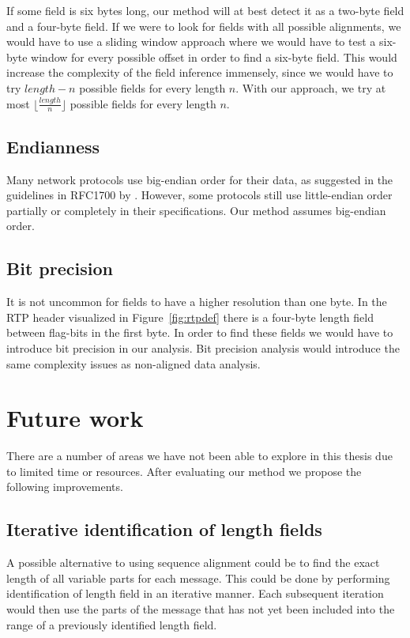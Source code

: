 \documentclass[a4paper]{report}
\begin{document}
If some field is six bytes long, our method will at best detect it as a
two-byte field and a four-byte field. If we were to look for fields with
all possible alignments, we would have to use a sliding window approach where
we would have to test a six-byte window for every possible offset in order
to find a six-byte field. This would increase the complexity of the field
inference immensely, since we would have to try $length - n$ possible fields
for every length $n$. With our approach, we try at most
$\lfloor \frac{length}{n} \rfloor$ possible fields for every length $n$.

\subsection{Endianness}
Many network protocols use big-endian order for their data, as suggested
in the guidelines in RFC1700 by \citet{reynolds94}. However, some protocols
still use little-endian order partially or completely in their specifications.
Our method assumes big-endian order.

\subsection{Bit precision}
It is not uncommon for fields to have a higher resolution than one byte. In
the RTP header visualized in Figure~\ref{fig:rtpdef} there is a four-byte
length field between flag-bits in the first byte. In order to find these
fields we would have to introduce bit precision in our analysis. Bit
precision analysis would introduce the same complexity issues as non-aligned
data analysis.


\section{Future work}
There are a number of areas we have not been able to explore in this thesis
due to limited time or resources. After evaluating our method we propose the
following improvements.

\subsection{Iterative identification of length fields}
A possible alternative to using sequence alignment could be to find the exact
length of all variable parts for each message. This could be done by performing
identification of length field in an iterative manner. Each subsequent iteration
would then use the parts of the message that has not yet been included into the
range of a previously identified length field.
\end{document}
